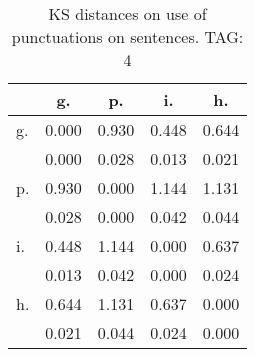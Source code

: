 \begin{table}[h!]
\begin{center}
\begin{tabular}{| l | c | c | c | c |}\hline
 & g. & p. & i. & h. \\\hline
g. & 0.000  & 0.930  & 0.448  & 0.644 \\\hline
 & 0.000  & 0.028  & 0.013  & 0.021 \\\hline
p. & 0.930  & 0.000  & 1.144  & 1.131 \\\hline
 & 0.028  & 0.000  & 0.042  & 0.044 \\\hline
i. & 0.448  & 1.144  & 0.000  & 0.637 \\\hline
 & 0.013  & 0.042  & 0.000  & 0.024 \\\hline
h. & 0.644  & 1.131  & 0.637  & 0.000 \\\hline
 & 0.021  & 0.044  & 0.024  & 0.000 \\\hline
\end{tabular}
\caption{KS distances on use of punctuations on sentences. TAG: 4}
\end{center}
\end{table}